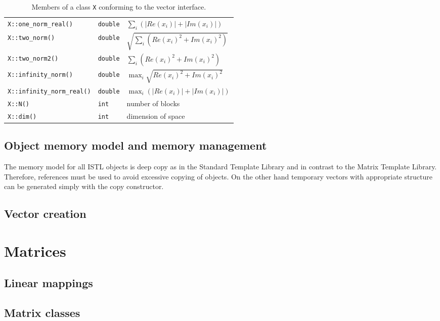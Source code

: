 \documentclass[11pt]{article}
\begin{document}
\begin{table}[htb]
\begin{center}
\begin{tabular}{|l|l|l|}
\texttt{X::one\_norm\_real()} & \texttt{double} &$\sum_i(|Re(x_i)|+|Im(x_i)|)$\\
\texttt{X::two\_norm()} & \texttt{double} &$\sqrt{\sum_i(Re(x_i)^2+Im(x_i)^2)}$\\
\texttt{X::two\_norm2()} & \texttt{double} &$\sum_i (Re(x_i)^2+Im(x_i)^2)$\\
\texttt{X::infinity\_norm()} & \texttt{double} &$\max_i\sqrt{Re(x_i)^2+Im(x_i)^2}$\\
\texttt{X::infinity\_norm\_real()} & \texttt{double} &$\max_i(|Re(x_i)|+|Im(x_i)|)$\\
\hline
\texttt{X::N()} & \texttt{int} & number of blocks\\
\texttt{X::dim()} & \texttt{int} & dimension of space\\
\hline
\end{tabular}
\end{center}

\caption{Members of a class \lstinline!X! conforming to the vector interface.}
\label{Tab:VectorMembers}
\end{table}

\subsection[Memory model]{Object memory model and memory management}

The memory model for all ISTL objects is deep copy as in the Standard
Template Library and in contrast to the Matrix Template
Library. Therefore, references must be used to avoid excessive copying
of objects. On the other hand temporary vectors with appropriate
structure can be generated simply with the copy constructor.



\subsection{Vector creation}

\section{Matrices}

\subsection{Linear mappings}

\subsection{Matrix classes}
\end{document}
